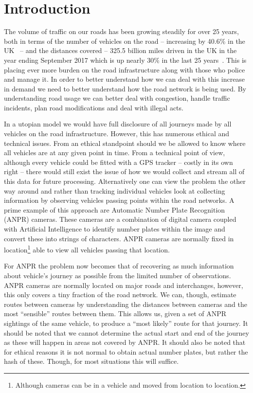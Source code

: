 \section{Introduction}

The volume of traffic on our roads has been growing steadily for over 25 years, both in terms of the number of vehicles on the road -- increasing by 40.6\% in the UK~\cite{noVehiocles} -- and the distances covered -- 325.5 billion miles driven in the UK in the year ending September 2017 which is up nearly 30\% in the last 25 years~\cite{distance}. This is placing ever more burden on the road infrastructure along with those who police and manage it. In order to better understand how we can deal with this increase in demand we need to better understand how the road network is being used. By understanding road usage we can better deal with congestion, handle traffic incidents, plan road modifications and deal with illegal acts.

In a utopian model we would have full disclosure of all journeys made by all vehicles on the road infrastructure. However, this has numerous ethical and technical issues. From an ethical standpoint should we be allowed to know where all vehicles are at any given point in time. From a technical point of view, although every vehicle could be fitted with a GPS tracker -- costly in its own right -- there would still exist the issue of how we would collect and stream all of this data for future processing. Alternatively one can view the problem the other way around and rather than tracking individual vehicles look at collecting information by observing vehicles passing points within the road networks. A prime example of this approach are Automatic Number Plate Recognition (ANPR) cameras. These cameras are a combination of digital camera coupled with Artificial Intelligence to identify number plates within the image and convert these into strings of characters. ANPR cameras are normally fixed in location\footnote{Although cameras can be in a vehicle and moved from location to location.} able to view all vehicles passing that location.

For ANPR the problem now becomes that of recovering as much information about vehicle's journey as possible from the limited number of observations. ANPR cameras are normally located on major roads and interchanges, however, this only covers a tiny fraction of the road network. We can, though, estimate routes between cameras by understanding the distances between cameras and the most ``sensible'' routes between them. This allows us, given a set of ANPR sightings of the same vehicle, to produce a ``most likely'' route for that journey. It should be noted that we cannot determine the actual start and end of the journey as these will happen in areas not covered by ANPR. It should also be noted that for ethical reasons it is not normal to obtain actual number plates, but rather the hash of these. Though, for most situations this will suffice.

